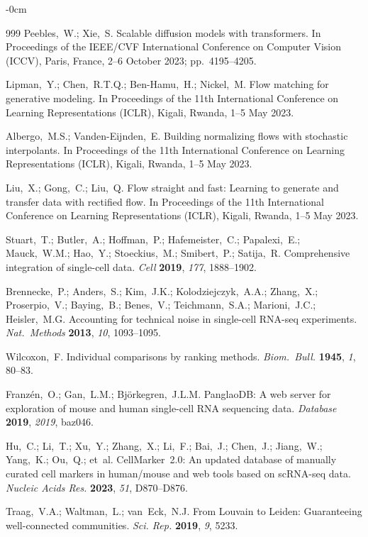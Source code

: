 \documentclass[biology,article,submit,pdftex,moreauthors]{Definitions/mdpi}
\begin{document}
\begin{adjustwidth}{-\extralength}{0cm}
\begin{thebibliography}{999}
Peebles,~W.; Xie,~S. Scalable diffusion models with transformers. In Proceedings of the IEEE/CVF International Conference on Computer Vision (ICCV), Paris, France, 2--6 October 2023; pp.\ 4195--4205.

Lipman,~Y.; Chen,~R.T.Q.; Ben-Hamu,~H.; Nickel,~M. Flow matching for generative modeling. In Proceedings of the 11th International Conference on Learning Representations (ICLR), Kigali, Rwanda, 1--5 May 2023.

Albergo,~M.S.; Vanden-Eijnden,~E. Building normalizing flows with stochastic interpolants. In Proceedings of the 11th International Conference on Learning Representations (ICLR), Kigali, Rwanda, 1--5 May 2023.

Liu,~X.; Gong,~C.; Liu,~Q. Flow straight and fast: Learning to generate and transfer data with rectified flow. In Proceedings of the 11th International Conference on Learning Representations (ICLR), Kigali, Rwanda, 1--5 May 2023.

Stuart,~T.; Butler,~A.; Hoffman,~P.; Hafemeister,~C.; Papalexi,~E.; Mauck,~W.M.; Hao,~Y.; Stoeckius,~M.; Smibert,~P.; Satija,~R. Comprehensive integration of single-cell data. {\em Cell} {\bf 2019}, {\em 177}, 1888--1902.

Brennecke,~P.; Anders,~S.; Kim,~J.K.; Kolodziejczyk,~A.A.; Zhang,~X.; Proserpio,~V.; Baying,~B.; Benes,~V.; Teichmann,~S.A.; Marioni,~J.C.; Heisler,~M.G. Accounting for technical noise in single-cell RNA-seq experiments. {\em Nat.\ Methods} {\bf 2013}, {\em 10}, 1093--1095.

Wilcoxon,~F. Individual comparisons by ranking methods. {\em Biom.\ Bull.} {\bf 1945}, {\em 1}, 80--83.

Franz\'{e}n,~O.; Gan,~L.M.; Bj\"{o}rkegren,~J.L.M. PanglaoDB: A web server for exploration of mouse and human single-cell RNA sequencing data. {\em Database} {\bf 2019}, {\em 2019}, baz046.

Hu,~C.; Li,~T.; Xu,~Y.; Zhang,~X.; Li,~F.; Bai,~J.; Chen,~J.; Jiang,~W.; Yang,~K.; Ou,~Q.; et~al. CellMarker~2.0: An updated database of manually curated cell markers in human/mouse and web tools based on scRNA-seq data. {\em Nucleic Acids Res.} {\bf 2023}, {\em 51}, D870--D876.

Traag,~V.A.; Waltman,~L.; van~Eck,~N.J. From Louvain to Leiden: Guaranteeing well-connected communities. {\em Sci. Rep.} {\bf 2019}, {\em 9}, 5233.


\end{thebibliography}
\end{adjustwidth}
\end{document}
